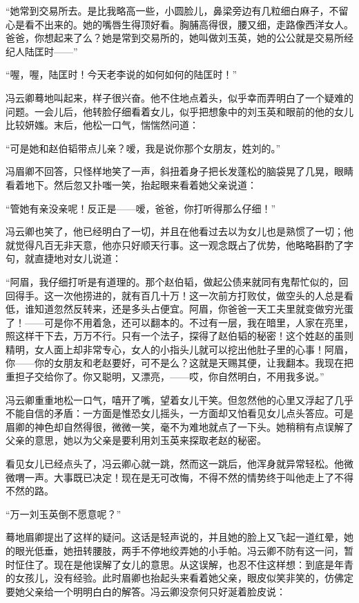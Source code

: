 \par “她常到交易所去。是比我略高一些，小圆脸儿，鼻梁旁边有几粒细白麻子，不留心是看不出来的。她的嘴唇生得顶好看。胸脯高得很，腰又细，走路像西洋女人。爸爸，你想起来了么？她是常到交易所的，她叫做刘玉英，她的公公就是交易所经纪人陆匡时——”
\par “喔，喔，陆匡时！今天老李说的如何如何的陆匡时！”
\par 冯云卿蓦地叫起来，样子很兴奋。他不住地点着头，似乎幸而弄明白了一个疑难的问题。一会儿后，他转脸仔细看着女儿，似乎把想象中的刘玉英和眼前的他的女儿比较妍媸。末后，他松一口气，惴惴然问道：
\par “可是她和赵伯韬带点儿亲？嗳，我是说你那个女朋友，姓刘的。”
\par 冯眉卿不回答，只怪样地笑了一声，斜扭着身子把长发蓬松的脑袋晃了几晃，眼睛看着地下。然后忽又扑嗤一笑，抬起眼来看着她父亲说道：
\par “管她有亲没亲呢！反正是——嗳，爸爸，你打听得那么仔细！”
\par 冯云卿也笑了，他已经明白了一切，并且在他看过去以为女儿也是熟惯了一切；他就觉得凡百无非天意，他亦只好顺天行事。这一观念既占了优势，他略略斟酌了字句，就直捷地对女儿说道：
\par “阿眉，我仔细打听是有道理的。那个赵伯韬，做起公债来就同有鬼帮忙似的，回回得手。这一次他捞进的，就有百几十万！这一次前方打败仗，做空头的人总是看低，谁知道忽然反转来，还是多头占便宜。阿眉，你爸爸一天工夫里就变做穷光蛋了！——可是你不用着急，还可以翻本的。不过有一层，我在暗里，人家在亮里，照这样干下去，万万不行。只有一个法子，探得了赵伯韬的秘密！这个姓赵的虽则精明，女人面上却非常专心，女人的小指头儿就可以挖出他肚子里的心事！阿眉，你——你的女朋友和老赵要好，可不是么？这就是天赐其便，让我翻本。我现在把重担子交给你了。你又聪明，又漂亮，——哎，你自然明白，不用我多说。”
\par 冯云卿重重地松一口气，嘻开了嘴，望着女儿干笑。但忽然他的心里又浮起了几乎不能自信的矛盾：一方面是惟恐女儿摇头，一方面却又怕看见女儿点头答应。可是眉卿的神色却自然得很，微微一笑，毫不为难地就点了一下头。她稍稍有点误解了父亲的意思，她以为父亲是要利用刘玉英来探取老赵的秘密。
\par 看见女儿已经点头了，冯云卿心就一跳，然而这一跳后，他浑身就异常轻松。他微微喟一声。大事既已决定！现在是无可改悔，不得不然的情势终于叫他走上了不得不然的路。
\par “万一刘玉英倒不愿意呢？”
\par 蓦地眉卿提出了这样的疑问。这话是轻声说的，并且她的脸上又飞起一道红晕，她的眼光低垂，她扭转腰肢，两手不停地绞弄她的小手帕。冯云卿不防有这一问，暂时怔住了。现在是他误解了女儿的意思。从这误解，也忍不住这样想：到底是年青的女孩儿，没有经验。此时眉卿也抬起头来看着她父亲，眼皮似笑非笑的，仿佛定要她父亲给一个明明白白的解答。冯云卿没奈何只好涎着脸皮说：
